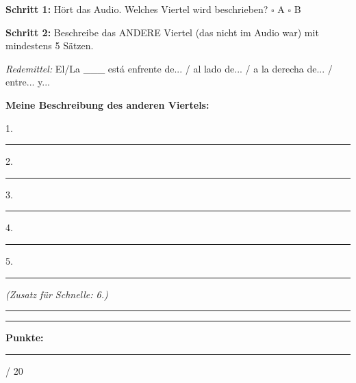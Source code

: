 \documentclass[10pt, a4paper]{article}
\newcommand{\sanstext}[1]{{\fontfamily{phv}\selectfont #1}}
\newcommand{\maxpunkte}{20}
\newcommand{\luecke}[1]{\rule{#1}{0.4pt}}
\begin{document}
\begin{hinweisbox}
\textbf{Schritt 1:} Hört das Audio. Welches Viertel wird beschrieben? \hspace{1cm} $\square$ A \hspace{1cm} $\square$ B

\vspace{4pt}

\textbf{Schritt 2:} Beschreibe das ANDERE Viertel (das nicht im Audio war) mit mindestens 5 Sätzen.

\vspace{2pt}

\textit{Redemittel:} El/La \_\_\_ está enfrente de... / al lado de... / a la derecha de... / entre... y...
\end{hinweisbox}

\vspace{6pt}

\textbf{Meine Beschreibung des anderen Viertels:}

\vspace{4pt}

1. \luecke{14cm}

\vspace{6pt}

2. \luecke{14cm}

\vspace{6pt}

3. \luecke{14cm}

\vspace{6pt}

4. \luecke{14cm}

\vspace{6pt}

5. \luecke{14cm}

\vspace{6pt}

\textit{(Zusatz für Schnelle: 6.)} \luecke{14cm}


\vfill

\noindent\rule{\textwidth}{0.5pt}

\vspace{4pt}

\hfill\sanstext{\textbf{Punkte:}} \luecke{1.2cm} / \maxpunkte
\end{document}
